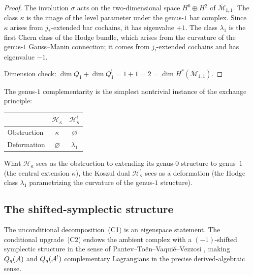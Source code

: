 \begin{proof}
The involution $\sigma$ acts on the
two-dimensional space $H^0 \oplus H^2$ of
$\overline{\mathcal{M}}_{1,1}$. The class $\kappa$ is the
image of the level parameter under the genus-$1$ bar
complex. Since $\kappa$
arises from $j_*$-extended bar cochains, it has eigenvalue
$+1$. The class $\lambda_1$ is the first Chern class of
the Hodge bundle, which arises from the curvature of the
genus-$1$ Gauss--Manin connection; it comes from $j_!$-extended
cochains and has eigenvalue $-1$.

Dimension check: $\dim Q_1 + \dim Q_1^! = 1 + 1 = 2
= \dim H^*(\overline{\mathcal{M}}_{1,1})$.
\end{proof}

\begin{remark}
\label{rem:thqg-III-def-obs-exchange}
The genus-$1$ complementarity is the simplest nontrivial
instance of the exchange principle:
\begin{center}
\begin{tabular}{l@{\quad}c@{\quad}c}
& $\mathcal{H}_\kappa$ & $\mathcal{H}_\kappa^!$ \\
\midrule
Obstruction & $\kappa$ & $\varnothing$ \\
Deformation & $\varnothing$ & $\lambda_1$ \\
\end{tabular}
\end{center}
What $\mathcal{H}_\kappa$ sees as the obstruction to
extending its genus-$0$ structure to genus~$1$ (the
central extension $\kappa$), the Koszul dual
$\mathcal{H}_\kappa^!$ sees as a deformation (the Hodge
class $\lambda_1$ parametrizing the curvature of the
genus-$1$ structure).
\end{remark}

%
%

\subsection{The shifted-symplectic structure}
\label{subsec:thqg-III-shifted-symplectic}

The unconditional decomposition~(C1) is an eigenspace statement.
The conditional upgrade~(C2) endows the ambient complex with a
$(-1)$-shifted symplectic structure in the sense of
Pantev--To\"{e}n--Vaqui\'{e}--Vezzosi \cite{PTVV13}, making
$Q_g(\mathcal{A})$ and $Q_g(\mathcal{A}^!)$ complementary Lagrangians in the
precise derived-algebraic sense.

